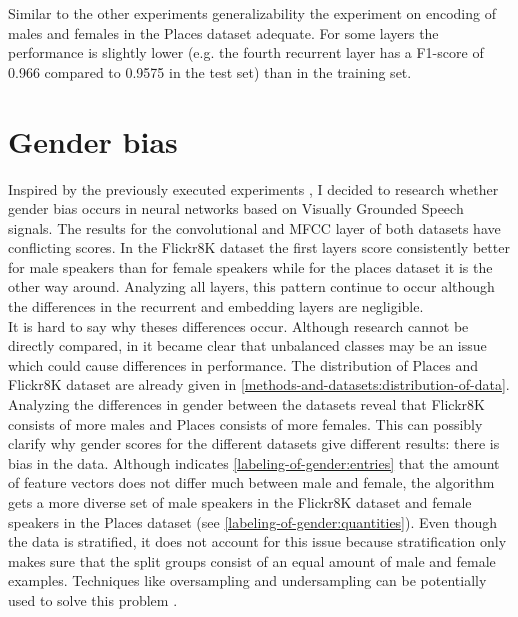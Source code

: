\documentclass[a4paper, oneside]{book}
\begin{document}
Similar to the other experiments generalizability the experiment on encoding of males and females in the Places dataset adequate. For some layers the performance is slightly lower (e.g. the fourth recurrent layer has a F1-score of 0.966 compared to 0.9575 in the test set) than in the training set. 

\section{Gender bias}\label{discussion:gender-bias}

Inspired by the previously executed experiments \cite{Tatman2017GenderAD}, I decided to research whether gender bias occurs in neural networks based on Visually Grounded Speech signals. The results for the convolutional and MFCC layer of both datasets have conflicting scores. In the Flickr8K dataset the first layers score consistently better for male speakers than for female speakers while for the places dataset it is the other way around. Analyzing all layers, this pattern continue to occur although the differences in the recurrent and embedding layers are negligible. \\ 

It is hard to say why theses differences occur. Although research cannot be directly compared, in \cite{Tatman2017GenderAD} it became clear that unbalanced classes may be an issue which could cause differences in performance. The distribution of Places and Flickr8K dataset are already given in \autoref{methods-and-datasets:distribution-of-data}. Analyzing the differences in gender between the datasets reveal that Flickr8K consists of more males and Places consists of more females. This can possibly clarify why gender scores for the different datasets give different results: there is bias in the data. Although indicates \autoref{labeling-of-gender:entries} that the amount of feature vectors does not differ much between male and female, the algorithm gets a more diverse set of male speakers in the Flickr8K dataset and female speakers in the Places dataset (see \autoref{labeling-of-gender:quantities}). Even though the data is stratified, it does not account for this issue because stratification only makes sure that the split groups consist of an equal amount of male and female examples. Techniques like oversampling and undersampling can be potentially used to solve this problem \cite{wiki:Oversamplingundersampling}.
\end{document}

